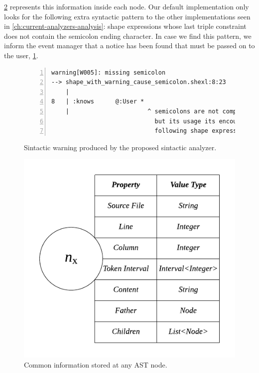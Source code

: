 \cref{fig:shex-lite-node-info} represents this information inside each node. Our default implementation only looks for the
following extra syntactic pattern to the other implementations seen in \cref{ch:current-analyzers-analysis}: shape expressions whose last
triple constraint does not contain the semicolon ending character. In case we find this pattern, we inform the event manager
that a notice has been found that must be passed on to the user, \cref{fig:sin-err-example}.

\begin{figure}
    \begin{lstlisting}[numbers=left,basicstyle=\ttfamily\scriptsize]
warning[W005]: missing semicolon
--> shape_with_warning_cause_semicolon.shexl:8:23
    |
8   | :knows      @:User *
    |                      ^ semicolons are not compulsory in the last triple constraint,
                             but its usage its encouraged as otherwise your code wont be
                             following shape expressions specification.
    \end{lstlisting}
    \caption[Sintactic warning produced by the proposed sintactic analyzer]{Sintactic warning produced by the proposed sintactic analyzer.}
    \label{fig:sin-err-example}
\end{figure}

\begin{figure}
    \includegraphics[scale=0.7]{images/shex-lite-node-table.pdf}
    \centering
    \caption[Common information stored at any AST node]{Common information stored at any AST node.}
    \label{fig:shex-lite-node-info}
\end{figure}

